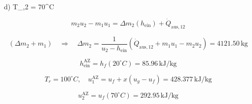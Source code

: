 d) \quad T_{,2} = 70^\circ C

\[
m_2 u_2 - m_1 u_1 = \Delta m_2 (h_{\text{ein}}) + \dot{Q}_{\text{aus},12}
\]

\[
(\Delta m_2 + m_1) \quad \Rightarrow \quad \Delta m_2 = \frac{1}{u_2 - h_{\text{ein}}} (\dot{Q}_{\text{aus},12} + m_1 u_1 - m_2 u_2) = 4121.50 \, \text{kg}
\]

\[
h_{\text{ein}}^{\text{AZ}} = h_f (20^\circ C) = 85.96 \, \text{kJ/kg}
\]

\[
T_r = 100^\circ C, \quad u_1^{\text{AZ}} = u_f + x (u_g - u_f) = 428.377 \, \text{kJ/kg}
\]

\[
u_2^{\text{AZ}} = u_f (70^\circ C) = 292.95 \, \text{kJ/kg}
\]